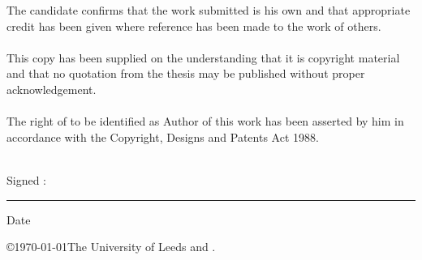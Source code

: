 
\begin{ipstatement} %

The candidate confirms that the work submitted is his own and that
appropriate credit has been given where reference has been made to
the work of others.
\\
\\
This copy has been supplied on the understanding that it is copyright
material and that no quotation from the thesis may be published
without proper acknowledgement.
\\
\\
The right of \theAuthor to be identified as Author of this work
has been asserted by him in accordance with the Copyright, Designs
and Patents Act 1988.
\\
\\
\vspace{1cm}

{\large Signed :\space}\rule{7cm}{0.2pt}{\large \space Date}\hrulefill\\

\hspace*{1.5cm}\theAuthor

\vspace{1cm}

\copyright \yeardate\today The University of Leeds and \theAuthor.

\end{ipstatement}


